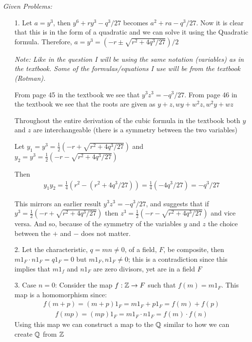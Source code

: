 \documentclass{article}
\begin{document}
\emph{Given Problems:}
\begin{enumerate}
    \item[1.] Let \(a = y^3\), then \(y^6 + ry^3 - q^3 / 27\) becomes \(a^2 + ra - q^3 / 27\). Now it is clear that this is in the form of a quadratic and we can solve it using the Quadratic formula. Therefore, \(a = y^3 = (-r \pm \sqrt{r^2 + 4q^3 / 27})/2\) 
    
    \emph{Note: Like in the question I will be using the same notation (variables) as in the textbook. Some of the formulas/equations I use will be from the textbook (Rotman).}

    From page 45 in the textbook we see that \(y^3 z^3 = -q^3 / 27\). From page 46 in the textbook we see that the roots are given as \(y+z, wy + w^2 z, w^2 y +wz\)

    Throughout the entire derivation of the cubic formula in the textbook both \(y\) and \(z\) are interchangeable (there is a symmetry between the two variables)
    
    Let \(y_1 = y^3 =\frac{1}{2}\left(-r + \sqrt{r^2+4 q^3 / 27}\right)\) and \(y_2 = y^3 =\frac{1}{2}\left(-r - \sqrt{r^2+4 q^3 / 27}\right)\) 

    Then
    \begin{eqnarray*}
        y_1y_2 =
        \frac{1}{4}(r^2 - (r^2 + 4q^3 / 27)) =
        \frac{1}{4}(-  4q^3 / 27) =
        - q^3 / 27
    \end{eqnarray*}

    This mirrors an earlier result \(y^3 z^3 = -q^3 / 27\), and suggests that if \(y^3 =\frac{1}{2}\left(-r + \sqrt{r^2+4 q^3 / 27}\right)\) then \(z^3 =\frac{1}{2}\left(-r - \sqrt{r^2+4 q^3 / 27}\right)\) and vice versa. And so, because of the symmetry of the variables \(y\) and \(z\) the choice between the \(+\) and \(-\) does not matter.

    \item[2.] Let the characteristic, \(q = mn \neq 0\), of a field, \(F\), be composite, then \(m1_F \cdot n1_F = q1_F = 0\) but \(m1_F, n1_F \neq 0\); this is a contradiction since this implies that \(m1_f\) and \(n1_F\) are zero divisors, yet are in a field \(F\)
 
    \item[3.] Case \(n = 0\):
    Consider the map \(f: \mathbb{Z} \to F\) such that \(f(m) = m1_F\).
    This map is a homomorphism since:
    \begin{eqnarray*}
        f(m + p) =
        (m + p)1_F =
        m1_F + p1_F =
        f(m) + f(p)
    \end{eqnarray*}
    \begin{eqnarray*}
        f(mp) =
        (mp)1_F =
        m1_F \cdot n1_F =
        f(m) \cdot f(n)
    \end{eqnarray*}
     Using this map we can construct a map to the \(\mathbb{Q}\) similar to how we can create \(\mathbb{Q}\) from \(\mathbb{Z}\) 
    

\end{enumerate}
\end{document}
